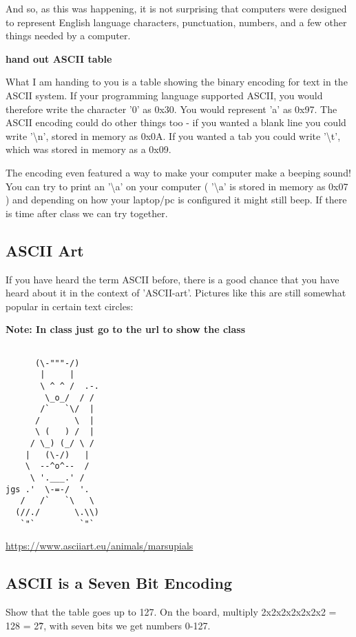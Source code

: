 \documentclass[12pt]{article}
\begin{document}
And so, as this was happening, it is not surprising that computers were designed to represent English language characters, punctuation, numbers, and a few other things needed by a computer. 

\begin{center}
\textbf{hand out ASCII table}
\end{center}

What I am handing to you is a table showing the binary encoding for text in the ASCII system. If your programming language supported ASCII, you would therefore write the character '0' as 0x30. You would represent 'a' as 0x97. The ASCII encoding could do other things too - if you wanted a blank line you could write '\textbackslash n', stored in memory as 0x0A. If you wanted a tab you could write '\textbackslash t', which was stored in memory as a 0x09.

The encoding even featured a way to make your computer make a beeping sound! You can try to print an '\textbackslash a' on your computer ( '\textbackslash a' is stored in memory as 0x07 ) and depending on how your laptop/pc is configured it might still beep. If there is time after class we can try together.

\subsection{ASCII Art}
If you have heard the term ASCII before, there is a good chance that you have heard about it in the context of 'ASCII-art'. Pictures like this are still somewhat popular in certain text circles:

\textbf{Note: In class just go to the url to show the class}

\begin{lstlisting}

      (\-"""-/)
       |     |
       \ ^ ^ /  .-.
        \_o_/  / /
       /`   `\/  |
      /       \  |
      \ (   ) /  |
     / \_) (_/ \ /
    |   (\-/)   |
    \  --^o^--  /
     \ '.___.' /
jgs .'  \-=-/  '.
   /   /`   `\   \
  (//./       \.\\)
   `"`         `"`

\end{lstlisting}

\url{https://www.asciiart.eu/animals/marsupials}

\subsection{ASCII is a Seven Bit Encoding}
Show that the table goes up to 127. On the board, multiply 2x2x2x2x2x2x2 = 128 = 2\^7, with seven bits we get numbers 0-127.
\end{document}
